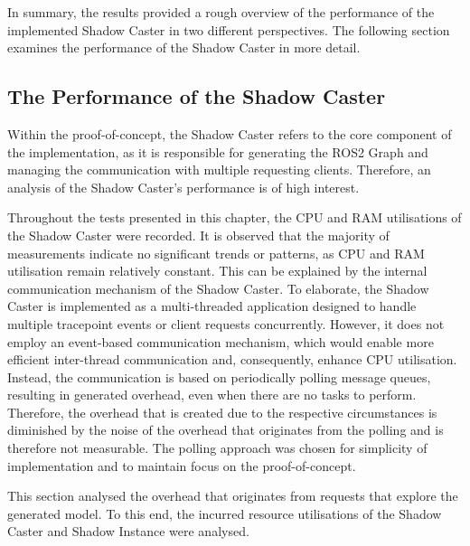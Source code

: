     In summary, the results provided a rough overview of the performance of the implemented Shadow Caster in two different perspectives. The following section examines the performance of the Shadow Caster in more detail.


    \subsection{The Performance of the Shadow Caster} \label{subsec:eval:ShadowCaster}
        Within the proof-of-concept, the Shadow Caster refers to the core component of the implementation, as it is responsible for generating the ROS2 Graph and managing the communication with multiple requesting clients. Therefore, an analysis of the Shadow Caster's performance is of high interest.

        Throughout the tests presented in this chapter, the CPU and RAM utilisations of the Shadow Caster were recorded. It is observed that the majority of measurements indicate no significant trends or patterns, as CPU and RAM utilisation remain relatively constant. This can be explained by the internal communication mechanism of the Shadow Caster. To elaborate, the Shadow Caster is implemented as a multi-threaded application designed to handle multiple tracepoint events or client requests concurrently. However, it does not employ an event-based communication mechanism, which would enable more efficient inter-thread communication and, consequently, enhance CPU utilisation. Instead, the communication is based on periodically polling message queues, resulting in generated overhead, even when there are no tasks to perform. Therefore, the overhead that is created due to the respective circumstances is diminished by the noise of the overhead that originates from the polling and is therefore not measurable.\newline
        The polling approach was chosen for simplicity of implementation and to maintain focus on the proof-of-concept.

        This section analysed the overhead that originates from requests that explore the generated model. To this end, the incurred resource utilisations of the Shadow Caster and Shadow Instance were analysed.


